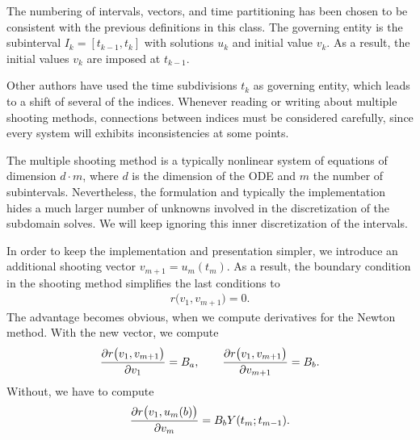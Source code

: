 

\begin{remark}
  The numbering of intervals, vectors, and time partitioning has been
  chosen to be consistent with the previous definitions in this
  class. The governing entity is the subinterval $I_k = [t_{k-1},
  t_k]$ with solutions $u_k$ and initial value $v_k$. As a result, the
  initial values $v_k$ are imposed at $t_{k-1}$.

  Other authors have used the time subdivisions $t_k$ as governing
  entity, which leads to a shift of several of the indices. Whenever
  reading or writing about multiple shooting methods, connections
  between indices must be considered carefully, since every system
  will exhibits inconsistencies at some points.
\end{remark}

\begin{remark}
  The multiple shooting method is a typically nonlinear system of
  equations of dimension $d\cdot m$, where $d$ is the dimension of the
  ODE and $m$ the number of subintervals. Nevertheless, the
  formulation and typically the implementation hides a much larger
  number of unknowns involved in the discretization of the subdomain
  solves. We will keep ignoring this inner discretization of the
  intervals.
\end{remark}

\begin{remark}
  In order to keep the implementation and presentation simpler, we
  introduce an additional shooting vector $v_{m+1} = u_m(t_m)$. As a
  result, the boundary condition in the shooting method simplifies the
  last conditions to
  \begin{gather}
    \label{eq:rwa:15}
      r\bigl(v_1, v_{m+1}\bigr) = 0.
  \end{gather}
  The advantage becomes obvious, when we compute derivatives for the
  Newton method. With the new vector, we compute
  \begin{gather*}
    \frac{\partial r\bigl(v_1, v_{m+1}\bigr)}{\partial v_1}
    = B_a, \qquad
    \frac{\partial r\bigl(v_1, v_{m+1}\bigr)}{\partial v_{m+1}}
    = B_b.
  \end{gather*}
  Without, we have to compute
  \begin{gather*}
    \frac{\partial r\bigl(v_1, u_m(b)\bigr)}{\partial v_{m}}
    = \rwab \fundamental(t_{m}; t_{m-1}).
  \end{gather*}
\end{remark}

